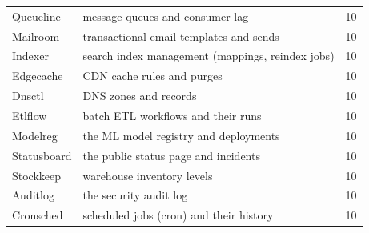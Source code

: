 \begin{table}[h]
\begin{tabularx}{\linewidth}{@{}l X r@{}}
Queueline & message queues and consumer lag & 10 \\
Mailroom & transactional email templates and sends & 10 \\
Indexer & search index management (mappings, reindex jobs) & 10 \\
Edgecache & CDN cache rules and purges & 10 \\
Dnsctl & DNS zones and records & 10 \\
Etlflow & batch ETL workflows and their runs & 10 \\
Modelreg & the ML model registry and deployments & 10 \\
Statusboard & the public status page and incidents & 10 \\
Stockkeep & warehouse inventory levels & 10 \\
Auditlog & the security audit log & 10 \\
Cronsched & scheduled jobs (cron) and their history & 10 \\
\bottomrule
\end{tabularx}
\end{table}
